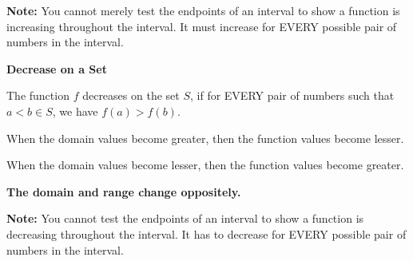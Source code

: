 \documentclass{ximera}
\begin{document}
\textbf{Note:} You cannot merely test the endpoints of an interval to show a function is increasing throughout the interval.  It must increase for EVERY possible pair of numbers in the interval.







\begin{definition} \textbf{\textcolor{green!50!black}{Decrease on a Set}} 

The function $f$ decreases on the set $S$, if for EVERY pair of numbers such that $a < b \in S$, we have  $f(a) > f(b)$. 

When the domain values become greater, then the function values become lesser.  

When the domain values become lesser, then the function values become greater.  


\textbf{\textcolor{purple!85!blue}{The domain and range change oppositely.}}



\end{definition}







\textbf{Note:} You cannot test the endpoints of an interval to show a function is decreasing throughout the interval.  It has to decrease for EVERY possible pair of numbers in the interval. 
\end{document}
